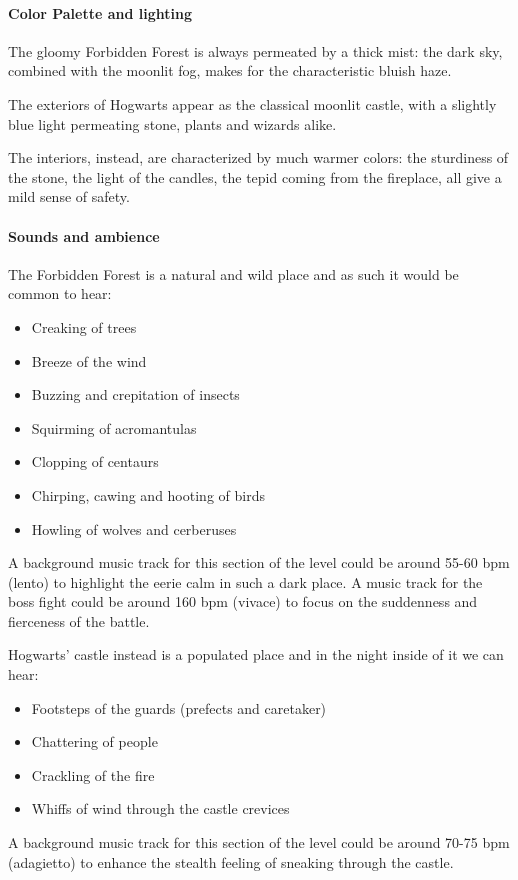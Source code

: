 \paragraph{Color Palette and lighting}
The gloomy Forbidden Forest is always permeated by a thick mist: the dark sky, combined with the moonlit fog, makes for the characteristic bluish haze.

The exteriors of Hogwarts appear as the classical moonlit castle, with a slightly blue light permeating stone, plants and wizards alike.

The interiors, instead, are characterized by much warmer colors: the sturdiness of the stone, the light of the candles, the tepid coming from the fireplace, all give a mild sense of safety.

\clearpage

\paragraph{Sounds and ambience}

The Forbidden Forest is a natural and wild place and as such it would be common to hear:
\begin{itemize}
	\item Creaking of trees
	\item Breeze of the wind
	\item Buzzing and crepitation of insects
	\item Squirming of acromantulas
	\item Clopping of centaurs 
	\item Chirping, cawing and hooting of birds
	\item Howling of wolves and cerberuses
\end{itemize}
A background music track for this section of the level could be around 55-60 bpm (lento) to highlight the eerie calm in such a dark place.
A music track for the boss fight could be around 160 bpm (vivace) to focus on the suddenness and fierceness of the battle.

Hogwarts' castle instead is a populated place and in the night inside of it we can hear:
\begin{itemize}
	\item Footsteps of the guards (prefects and caretaker)
	\item Chattering of people
	\item Crackling of the fire
	\item Whiffs of wind through the castle crevices
\end{itemize}
A background music track for this section of the level could be around 70-75 bpm (adagietto) to enhance the stealth feeling of sneaking through the castle.

\pagebreak